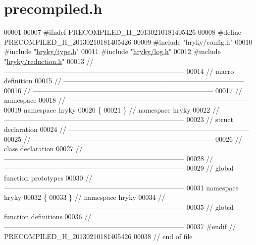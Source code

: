 \hypertarget{type_2src_2precompiled_8h_source}{\section{precompiled.\-h}
}

\begin{DoxyCode}
00001 
00007 \textcolor{preprocessor}{#ifndef PRECOMPILED\_H\_20130210181405426}
00008 \textcolor{preprocessor}{}\textcolor{preprocessor}{#define PRECOMPILED\_H\_20130210181405426}
00009 \textcolor{preprocessor}{}\textcolor{preprocessor}{#include "hryky/config.h"}
00010 \textcolor{preprocessor}{#include "\hyperlink{type_8h}{hryky/type.h}"}
00011 \textcolor{preprocessor}{#include "\hyperlink{log_8h}{hryky/log.h}"}
00012 \textcolor{preprocessor}{#include "\hyperlink{reduction_8h}{hryky/reduction.h}"}
00013 \textcolor{comment}{//
      ------------------------------------------------------------------------------}
00014 \textcolor{comment}{// macro definition}
00015 \textcolor{comment}{//
      ------------------------------------------------------------------------------}
00016 \textcolor{comment}{//
      ------------------------------------------------------------------------------}
00017 \textcolor{comment}{// namespace}
00018 \textcolor{comment}{//
      ------------------------------------------------------------------------------}
00019 \textcolor{keyword}{namespace }hryky
00020 \{
00021 \} \textcolor{comment}{// namespace hryky}
00022 \textcolor{comment}{//
      ------------------------------------------------------------------------------}
00023 \textcolor{comment}{// struct declaration}
00024 \textcolor{comment}{//
      ------------------------------------------------------------------------------}
00025 \textcolor{comment}{//
      ------------------------------------------------------------------------------}
00026 \textcolor{comment}{// class declaration}
00027 \textcolor{comment}{//
      ------------------------------------------------------------------------------}
00028 \textcolor{comment}{//
      ------------------------------------------------------------------------------}
00029 \textcolor{comment}{// global function prototypes}
00030 \textcolor{comment}{//
      ------------------------------------------------------------------------------}
00031 \textcolor{keyword}{namespace }hryky
00032 \{
00033 \} \textcolor{comment}{// namespace hryky}
00034 \textcolor{comment}{//
      ------------------------------------------------------------------------------}
00035 \textcolor{comment}{// global function definitions}
00036 \textcolor{comment}{//
      ------------------------------------------------------------------------------}
00037 \textcolor{preprocessor}{#endif // PRECOMPILED\_H\_20130210181405426}
00038 \textcolor{preprocessor}{}\textcolor{comment}{// end of file}
\end{DoxyCode}

